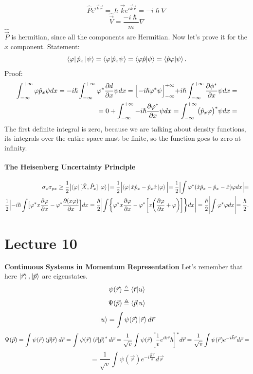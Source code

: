 \documentclass{article}
\begin{document}
$$\hat{P}e^{i\vec{k}\vec{r}}= \hslash \vec{k}e^{i\vec{k}\vec{r}}  =  -i \hslash \nabla  $$
$$\hat{\vec{V}} = \frac{-i\hslash}{m} \nabla $$
$\hat{\vec{P}}$ is hermitian, since all the components are Hermitian. Now let's prove it for the $x$ component.
Statement:
$$ \bra{\varphi} \hat{p}_x \ket{\psi} = \bra{\varphi} \ket{\hat{p}_x \psi} = \bra{ \varphi \hat{p}} \ket{\psi} = \bra{\hat{p}\varphi}\ket{\psi}.$$
Proof:
\begin{align*}
 \int_{-\infty}^{+\infty} \varphi \hat{p}_x \psi dx = -i\hslash \int_{-\infty}^{+\infty} \varphi^* \frac{\partial{d}}{\partial{x}} \psi dx = \Bigl[ -i\hslash\varphi^*\psi \Bigl]_{-\infty}^{+\infty} + i \hslash \int_{-\infty}^{+\infty} \frac{\partial \phi^*}{\partial x} \psi dx = \\ = 0 + \int_{-\infty}^{+\infty} -i \hslash \frac{\partial \varphi^*}{\partial x} \psi dx = \int_{-\infty}^{+\infty} \bigl( \hat{p}_x \varphi \bigl)^* \psi dx =  \end{align*}
The first  definite integral is zero, because we are talking about density functions, its integrals over the entire space must be finite, so the function goes to zero at infinity.

\paragraph{The Heisenberg Uncertainty Principle}
\begin{align*}
    \sigma_x\sigma_{px} \geq \frac{1}{2} \bigl| \bra{\varphi} [ \hat{X}, \hat{P}_x] \ket{\varphi} \bigl| = \frac{1}{2} \Bigl| \bra{\varphi} \hat{x}\hat{p}_x - \hat{p}_x \hat{x} \ket{\varphi} \Bigl| = \frac{1}{2} \Bigl| \int \varphi^* (\hat{x}\hat{p}_x -\hat{p}_x-\hat{x}) \varphi dx \Bigl| = \\ \frac{1}{2} \Bigl| -i\hslash \int \bigl[\varphi^* x \frac{\partial \varphi}{\partial x} - \varphi^* \frac{\partial{(x\varphi)}}{\partial x} \Bigl] dx  = \frac{\hslash}{2} \biggl| \int \biggl\{ \varphi^* x \frac{\partial \varphi}{\partial x} - \varphi^* \biggl[ x \biggl( \frac{\partial \varphi}{\partial x} + \varphi \biggl)\biggr] \biggr\} dx \biggr|  = \frac{\hslash}{2} \Biggl| \int \varphi^* \varphi dx \Biggl| = \frac{\hslash}{2}.
\end{align*}

\section{Lecture 10}
\textbf{Continuous Systems in Momentum Representation}
Let's remember that here $\ket{\vec{r}},\ket{\vec{p}}$ are eigenstates.
$$\psi(\vec{r}) \triangleq \bra{\vec{r}}\ket{u}$$
$$\Psi(\vec{p}) \triangleq \bra{\vec{p}}\ket{u}$$
$$\ket{u} = \int \psi (\vec{r}) \ket{\vec{r}} d\vec{r}$$
$$\Psi(\vec{p}) = \int \psi(\vec{r}) \bra{\vec{p}}\ket{\vec{r}}d\vec{r} = \int \psi(\vec{r}) \bra{\vec{r}}\ket{\vec{p}}^* d\vec{r} = \frac{1}{\sqrt{v}} \int \psi(\vec{r}) \biggl[ \frac{1}{v}e^{ik\vec{r}}{\hslash} \biggl]^*d\vec{r} =  \frac{1}{\sqrt{v}} \int \psi(\vec{r}) e^{-i\vec{k}\Vec{r}}d\vec{r} =$$ $$ = \frac{1}{\sqrt{v}} \int \psi(\vec{r}) e^{-i \frac{\vec{p}\vec{r}}{\hslash}}d\vec{r}$$ \\ 
\end{document}
